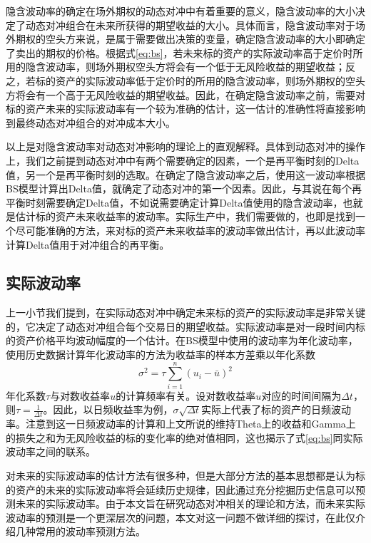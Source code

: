 隐含波动率的确定在场外期权的动态对冲中有着重要的意义，隐含波动率的大小决定了动态对冲组合在未来所获得的期望收益的大小。具体而言，隐含波动率对于场外期权的空头方来说，是属于需要做出决策的变量，确定隐含波动率的大小即确定了卖出的期权的价格。根据式\ref{eq:bs}，若未来标的资产的实际波动率高于定价时所用的隐含波动率，则场外期权空头方将会有一个低于无风险收益的期望收益；反之，若标的资产的实际波动率低于定价时的所用的隐含波动率，则场外期权的空头方将会有一个高于无风险收益的期望收益。因此，在确定隐含波动率之前，需要对标的资产未来的实际波动率有一个较为准确的估计，这一估计的准确性将直接影响到最终动态对冲组合的对冲成本大小。

以上是对隐含波动率对动态对冲影响的理论上的直观解释。具体到动态对冲的操作上，我们之前提到动态对冲中有两个需要确定的因素，一个是再平衡时刻的Delta值，另一个是再平衡时刻的选取。在确定了隐含波动率之后，使用这一波动率根据BS模型计算出Delta值，就确定了动态对冲的第一个因素。因此，与其说在每个再平衡时刻需要确定Delta值，不如说需要确定计算Delta值使用的隐含波动率，也就是估计标的资产未来收益率的波动率。实际生产中，我们需要做的，也即是找到一个尽可能准确的方法，来对标的资产未来收益率的波动率做出估计，再以此波动率计算Delta值用于对冲组合的再平衡。

\subsection{实际波动率}

上一小节我们提到，在实际动态对冲中确定未来标的资产的实际波动率是非常关键的，它决定了动态对冲组合每个交易日的期望收益。实际波动率是对一段时间内标的资产价格平均波动幅度的一个估计。在BS模型中使用的波动率为年化波动率，使用历史数据计算年化波动率的方法为收益率的样本方差乘以年化系数
\begin{equation}
  \sigma^2=\tau\sum_{i=1}^n (u_i-\bar{u})^2
\end{equation}
年化系数$\tau$与对数收益率$u$的计算频率有关。设对数收益率$u$对应的时间间隔为$\Delta t$，则$\tau=\frac{1}{\Delta t}$。因此，以日频收益率为例，$\sigma \sqrt{\Delta t}$实际上代表了标的资产的日频波动率。注意到这一日频波动率的计算和上文所说的维持Theta上的收益和Gamma上的损失之和为无风险收益的标的变化率的绝对值相同，这也揭示了式\ref{eq:bs}同实际波动率之间的联系。

对未来的实际波动率的估计方法有很多种，但是大部分方法的基本思想都是认为标的资产的未来的实际波动率将会延续历史规律，因此通过充分挖掘历史信息可以预测未来的实际波动率。由于本文旨在研究动态对冲相关的理论和方法，而未来实际波动率的预测是一个更深层次的问题，本文对这一问题不做详细的探讨，在此仅介绍几种常用的波动率预测方法。

